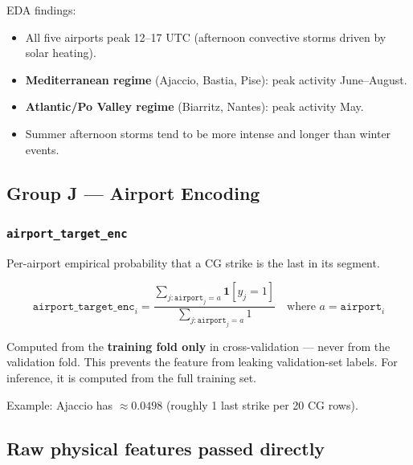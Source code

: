 \documentclass[12pt,a4paper]{article}
\newcommand{\feat}[1]{\texttt{\textbf{#1}}}
\begin{document}
EDA findings:
\begin{itemize}
  \item All five airports peak 12--17 UTC (afternoon convective storms driven by solar heating).
  \item \textbf{Mediterranean regime} (Ajaccio, Bastia, Pise): peak activity June--August.
  \item \textbf{Atlantic/Po Valley regime} (Biarritz, Nantes): peak activity May.
  \item Summer afternoon storms tend to be more intense and longer than winter events.
\end{itemize}

\vspace{1em}

\subsection{Group J --- Airport Encoding}

\subsubsection*{\feat{airport\_target\_enc}}

Per-airport empirical probability that a CG strike is the last in its segment.

\begin{formulabox}
\[
  \texttt{airport\_target\_enc}_i
  = \frac{\sum_{j: \texttt{airport}_j = a} \mathbf{1}[y_j = 1]}
         {\sum_{j: \texttt{airport}_j = a} 1}
  \quad \text{where } a = \texttt{airport}_i
\]
\end{formulabox}

Computed from the \textbf{training fold only} in cross-validation --- never from the validation fold. This prevents the feature from leaking validation-set labels. For inference, it is computed from the full training set.

Example: Ajaccio has $\approx 0.0498$ (roughly 1 last strike per 20 CG rows).

\vspace{1em}

\subsection{Raw physical features passed directly}
\end{document}
